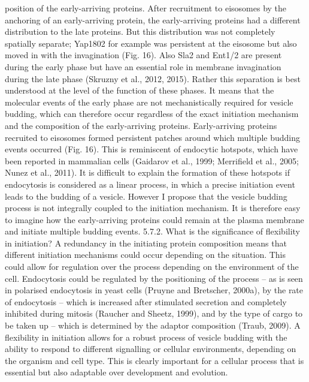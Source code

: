 position of the early-arriving proteins. After recruitment to eisosomes by the anchoring of an early-arriving protein, the early-arriving proteins had a different distribution to the late proteins. But this distribution was not completely spatially separate; Yap1802 for example was persistent at the eisosome but also moved in with the invagination (Fig. 16). Also Sla2 and Ent1/2 are present during the early phase but have an essential role in membrane invagination during the late phase (Skruzny et al., 2012, 2015). Rather this separation is best understood at the level of the function of these phases. It means that the molecular events of the early phase are not mechanistically required for vesicle budding, which can therefore occur regardless of the exact initiation mechanism and the composition of the early-arriving proteins. 
Early-arriving proteins recruited to eisosomes formed persistent patches around which multiple budding events occurred (Fig. 16). This is reminiscent of endocytic hotspots, which have been reported in mammalian cells (Gaidarov et al., 1999; Merrifield et al., 2005; Nunez et al., 2011). It is difficult to explain the formation of these hotspots if endocytosis is considered as a linear process, in which a precise initiation event leads to the budding of a vesicle. However I propose that the vesicle budding process is not integrally coupled to the initiation mechanism. It is therefore easy to imagine how the early-arriving proteins could remain at the plasma membrane and initiate multiple budding events. 
5.7.2. What is the significance of flexibility in initiation? 
A redundancy in the initiating protein composition means that different initiation mechanisms could occur depending on the situation. This could allow for regulation over the process depending on the environment of the cell. Endocytosis could be regulated by the positioning of the process – as is seen in polarised endocytosis in yeast cells (Pruyne and Bretscher, 2000a), by the rate of endocytosis – which is increased after stimulated secretion and completely inhibited during mitosis (Raucher and Sheetz, 1999), and by the type of cargo to be taken up – which is determined by the adaptor composition (Traub, 2009). A flexibility in initiation allows for a robust process of vesicle budding with the ability to respond to different signalling or cellular environments, depending on the organism and cell type. This is clearly important for a cellular process that is essential but also adaptable over development and evolution. 
